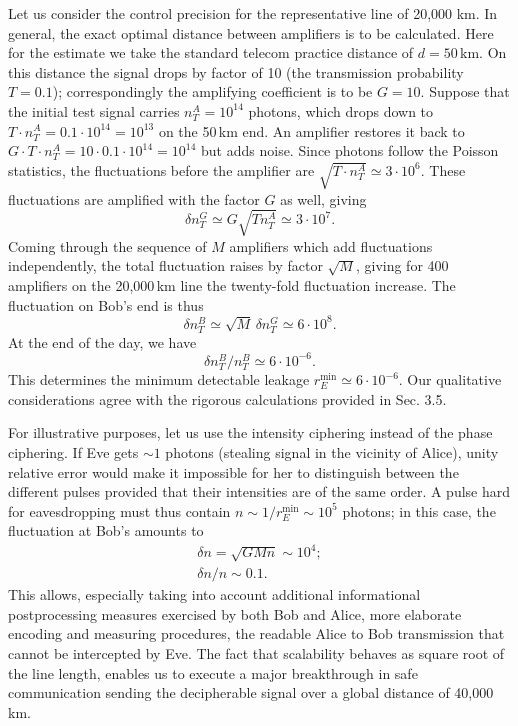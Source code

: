 \documentclass[a4paper]{article}
\begin{document}
Let us consider the control precision for the representative line of 20,000 km.
In general, the exact optimal distance between amplifiers is to be calculated. Here for the estimate we take the standard telecom practice distance of $d=50$\,km. 
On this distance the signal drops by factor of 10 (the transmission probability $T=0.1$); correspondingly the amplifying coefficient is to be $G=10$. 
Suppose that the initial test signal carries $n^{A}_{T}=10^{14}$ photons, which drops down to $T\cdot n^{A}_{T} = 0.1\cdot 10^{14} = 10^{13}$ on the 50\,km end. 
An amplifier restores it back to $G\cdot T\cdot n^{A}_{T} = 10\cdot 0.1\cdot 10^{14} = 10^{14}$ but adds noise. 
Since photons follow the Poisson statistics, the fluctuations before the amplifier are $\sqrt{T\cdot n^{A}_{T}} \simeq 3\cdot 10^6$. 
These fluctuations are amplified with the factor $G$ as well, giving 
%
\begin{equation}
    \delta n^G_T\simeq G \sqrt{T n^{A}_{T}}\simeq 3 \cdot 10^7.
\end{equation}
%
Coming through the sequence of $M$ amplifiers which add fluctuations independently, the total fluctuation raises by factor $\sqrt{M}$, giving for 400 amplifiers on the 20,000\,km line the twenty-fold fluctuation increase. 
The fluctuation on Bob's end is thus
% 
\begin{equation}
    \delta n^{B}_{T}\simeq\sqrt{M}\,\delta n^G_T\simeq6\cdot 10^8.
\end{equation} 
%
At the end of the day, we have
%
\begin{equation}
    \delta n^{B}_{T}/n^{B}_{T}\simeq6\cdot 10^{-6}.
\end{equation}
%
This determines the minimum detectable leakage $r_E^\text{min}\simeq 6\cdot 10^{-6}$.
Our qualitative considerations agree with the rigorous calculations provided in Sec. 3.5.

For illustrative purposes, let us use the intensity ciphering instead of the phase ciphering.
If Eve gets $\sim 1$ photons (stealing signal in the vicinity of Alice), unity relative error would make it impossible for her to distinguish between the different pulses provided that their intensities are of the same order.
A pulse hard for eavesdropping must thus contain $n\sim 1/r_E^\text{min} \sim 10^5$ photons; in this case, the fluctuation at Bob's amounts to 
%
\begin{gather}
    \delta n = \sqrt{G M n} \sim 10^4;\\  
    \delta n/n\sim  0.1.
\end{gather}
This allows, especially taking into account additional informational postprocessing measures exercised by both Bob and Alice, more elaborate encoding and measuring procedures, the readable Alice to Bob transmission that cannot be intercepted by Eve. The fact that scalability behaves as square root of the line length, enables us to execute a major breakthrough in safe communication sending the decipherable signal over a global distance of 40,000\,km. 
\end{document}
